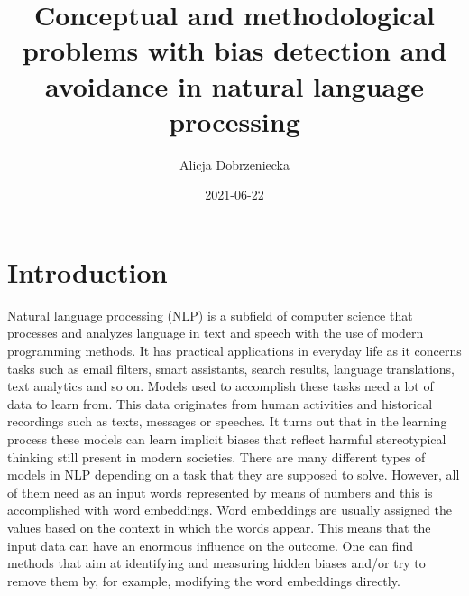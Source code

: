 \documentclass[
  12pt,
]{book}
\title{Conceptual and methodological problems with bias detection and avoidance in natural language processing}
\author{Alicja Dobrzeniecka}
\date{2021-06-22}
\begin{document}
\maketitle

{
\hypersetup{linkcolor=}
\setcounter{tocdepth}{5}
\tableofcontents
}
\hypertarget{introduction}{%
\chapter{Introduction}\label{introduction}}

Natural language processing (NLP) is a subfield of computer science that processes and analyzes language in text and speech with the use of modern programming methods. It has practical applications in everyday life as it concerns tasks such as email filters, smart assistants, search results, language translations, text analytics and so on. Models used to accomplish these tasks need a lot of data to learn from. This data originates from human activities and historical recordings such as texts, messages or speeches. It turns out that in the learning process these models can learn implicit biases that reflect harmful stereotypical thinking still present in modern societies. There are many different types of models in NLP depending on a task that they are supposed to solve. However, all of them need as an input words represented by means of numbers and this is accomplished with word embeddings. Word embeddings are usually assigned the values based on the context in which the words appear. This means that the input data can have an enormous influence on the outcome. One can find methods that aim at identifying and measuring hidden biases and/or try to remove them by, for example, modifying the word embeddings directly.
\end{document}
